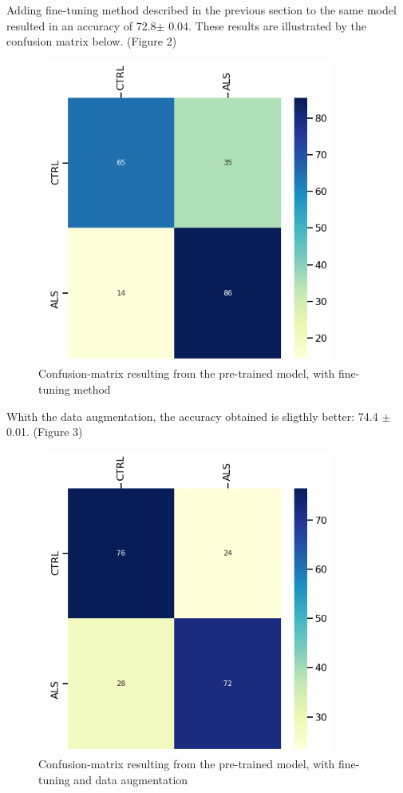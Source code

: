 Adding fine-tuning method described in the previous section to the same model resulted in an accuracy of 72.8$\pm$ 0.04. These results are illustrated by the confusion matrix below. (Figure 2)
\begin{figure}[H]
\centering
\caption{Confusion-matrix resulting from the pre-trained model, with fine-tuning method}
\includegraphics[width=10cm, height=10cm]{finetuning_model_results}
\end{figure}

Whith the data augmentation, the accuracy obtained is sligthly better: 74.4 $\pm$ 0.01. (Figure 3)
\begin{figure}[H]
\centering
\caption{Confusion-matrix resulting from the pre-trained model, with fine-tuning and data augmentation}
\includegraphics[width=10cm, height=10cm]{finetuning_data_augmentation_model_results}
\end{figure}

